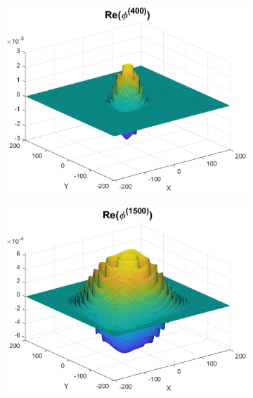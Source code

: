 \documentclass[11pt, letter]{book}
\begin{document}
\begin{figure}[!htb]
    \centering
    \begin{subfigure}{0.49\textwidth}
    \includegraphics[scale=0.52]{Real_400.eps}
    \end{subfigure}
    \begin{subfigure}{0.49\textwidth}
    \includegraphics[scale=0.52]{Real_1500.eps}
    \end{subfigure}
    \vspace{1cm}
    \begin{subfigure}{0.49\textwidth}

\end{subfigure}
\end{figure}
\end{document}
